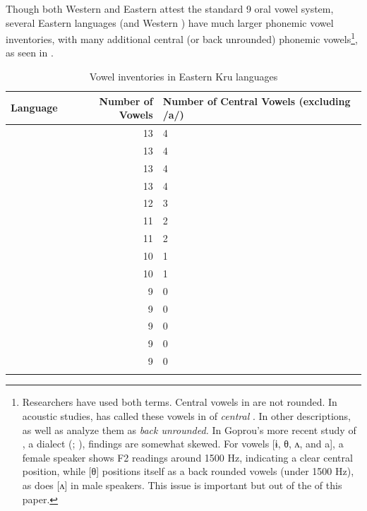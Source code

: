 \documentclass[output=paper,newtxmath,modfonts,nonflat,draft]{langsci/langscibook}
\begin{document}
Though both Western and Eastern  attest the standard 9 oral vowel system, several Eastern  languages (and Western ) have much larger phonemic vowel inventories, with many additional central (or back unrounded) phonemic vowels\footnote{Researchers have used both terms.  Central vowels in  are not rounded. In acoustic studies, \citet{grégoire1972} has called these vowels in  of  \textit{central} \citep[see also][15]{Zogbo1981}. In other descriptions, \citet[61]{Werle1976} as well as \citet[7]{kipre2005} analyze them as \textit{back unrounded.} In Goprou’s more recent study of , a  dialect (\citeyear{Goprou2010}; \citeyear[177]{Goprou2014}), findings are somewhat skewed. For vowels [ɨ, θ, ʌ, and a], a female speaker shows F2 readings around 1500 Hz, indicating a clear central position, while [θ] positions itself as a back rounded vowels (under 1500 Hz), as does [ʌ] in male speakers. This issue is important but out of the  of this paper.}, as seen in .

\begin{table}
\small
\begin{tabularx}{\textwidth}{l@{}rR{6.8cm}}
\lsptoprule
\textbf{Language} & \textbf{Number of Vowels} & \textbf{Number of Central Vowels (excluding /a/)}\\
\midrule
{} & 13 & 4\\
 & 13 & 4\\
  & 13 & 4\\
 & 13 & 4\\
  & 12 & 3\\
 & 11 & 2\\
 & 11 & 2\\
 & 10 & 1\\
 & 10 & 1\\
 & 9 & 0\\
 & 9 & 0\\
 & 9 & 0\\
 & 9 & 0\\
 & 9 & 0\\          
\lspbottomrule
\end{tabularx}
\caption{Vowel inventories in Eastern Kru languages}
\label{tab:zogbo:4}
\end{table}
\end{document}
